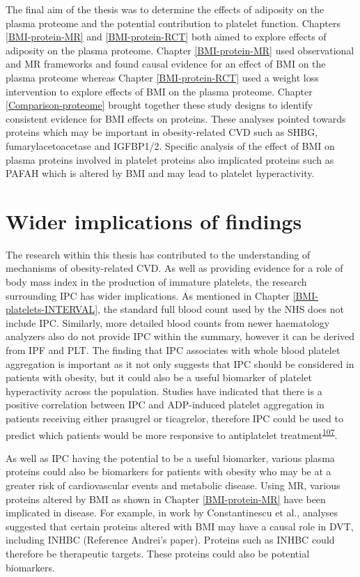 \documentclass[11pt,twoside]{bristolthesis}
\begin{document}
The final aim of the thesis was to determine the effects of adiposity on the plasma proteome and the potential contribution to platelet function. Chapters \ref{BMI-protein-MR} and \ref{BMI-protein-RCT} both aimed to explore effects of adiposity on the plasma proteome. Chapter \ref{BMI-protein-MR} used observational and MR frameworks and found causal evidence for an effect of BMI on the plasma proteome whereas Chapter \ref{BMI-protein-RCT} used a weight loss intervention to explore effects of BMI on the plasma proteome. Chapter \ref{Comparison-proteome} brought together these study designs to identify consistent evidence for BMI effects on proteins. These analyses pointed towards proteins which may be important in obesity-related CVD such as SHBG, fumarylacetoacetase and IGFBP1/2. Specific analysis of the effect of BMI on plasma proteins involved in platelet proteins also implicated proteins such as PAFAH which is altered by BMI and may lead to platelet hyperactivity.

\hypertarget{wider-implications-of-findings}{%
\section{Wider implications of findings}\label{wider-implications-of-findings}}

The research within this thesis has contributed to the understanding of mechanisms of obesity-related CVD. As well as providing evidence for a role of body mass index in the production of immature platelets, the research surrounding IPC has wider implications. As mentioned in Chapter \ref{BMI-platelets-INTERVAL}, the standard full blood count used by the NHS does not include IPC. Similarly, more detailed blood counts from newer haematology analyzers also do not provide IPC within the summary, however it can be derived from IPF and PLT. The finding that IPC associates with whole blood platelet aggregation is important as it not only suggests that IPC should be considered in patients with obesity, but it could also be a useful biomarker of platelet hyperactivity across the population. Studies have indicated that there is a positive correlation between IPC and ADP-induced platelet aggregation in patients receiving either prasugrel or ticagrelor, therefore IPC could be used to predict which patients would be more responsive to antiplatelet treatment\textsuperscript{\protect\hyperlink{ref-Bernlochner2015a}{107}}.

As well as IPC having the potential to be a useful biomarker, various plasma proteins could also be biomarkers for patients with obesity who may be at a greater risk of cardiovascular events and metabolic disease. Using MR, various proteins altered by BMI as shown in Chapter \ref{BMI-protein-MR} have been implicated in disease. For example, in work by Constantinescu et al., analyses suggested that certain proteins altered with BMI may have a causal role in DVT, including INHBC (Reference Andrei's paper). Proteins such as INHBC could therefore be therapeutic targets. These proteins could also be potential biomarkers.
\end{document}
